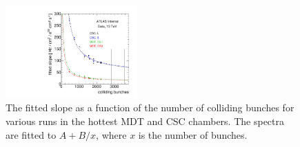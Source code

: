 \begin{figure}
  \begin{center}
    \includegraphics[width=0.45\textwidth]{./figures/slope_vs_bunches.pdf}
    \caption{The fitted slope as a function of the number of colliding bunches for various runs in the hottest MDT and CSC chambers. The spectra are fitted to $A + B/x$, where $x$ is the number of bunches.}
    \label{fig:extrapolations-slope-vs-bunches}
  \end{center}
\end{figure}



